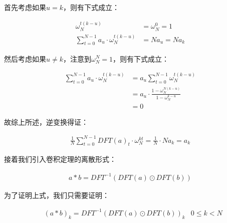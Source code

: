 \documentclass[UTF8]{book}
\begin{document}
首先考虑如果$u=k$，则有下式成立：
\begin{large}
    \begin{equation}
        \begin{aligned}
            \omega_N^{t(k-u)}&=\omega_N^{0}=1 \\
            \sum_{t=0}^{N-1}a_u \cdot \omega_N^{t(k-u)}&=Na_u=Na_k
            \nonumber
        \end{aligned}
    \end{equation}
\end{large}
然后考虑如果$u \not = k$，注意到$\omega_N^N=1$，则有下式成立：
\begin{large}
    \begin{equation}
        \begin{aligned}
            \sum_{t=0}^{N-1}a_u \cdot \omega_N^{t(k-u)} &= a_u\sum_{t=0}^{N-1}\omega_N^{t(k-u)} \\
            &= a_u \cdot \frac{1-\omega_N^{N(k-u)}}{1-\omega_N^{k-u}} \\
            &= 0
            \nonumber
        \end{aligned}
    \end{equation}
\end{large}
故综上所述，逆变换得证：
\begin{large}
    \begin{equation}
        \begin{aligned}
            \frac{1}{N}\sum_{t=0}^{N-1}{DFT(a)_t \cdot \omega_{N}^{kt}}=\frac{1}{N} \cdot Na_k=a_k
            \nonumber
        \end{aligned}
    \end{equation}
\end{large}
接着我们引入卷积定理的离散形式：
\begin{large}
    \begin{equation}
        \begin{aligned}
            a*b=DFT^{-1}\left ( DFT(a) \odot DFT(b) \right )
            \nonumber
        \end{aligned}
    \end{equation}
\end{large}
为了证明上式，我们只需要证明：
\begin{large}
    \begin{equation}
        \begin{aligned}
            &(a*b)_k=DFT^{-1}\left ( DFT(a) \odot DFT(b) \right )_k & 0 \le k < N
            \nonumber
        \end{aligned}
    \end{equation}
\end{large}
\end{document}
